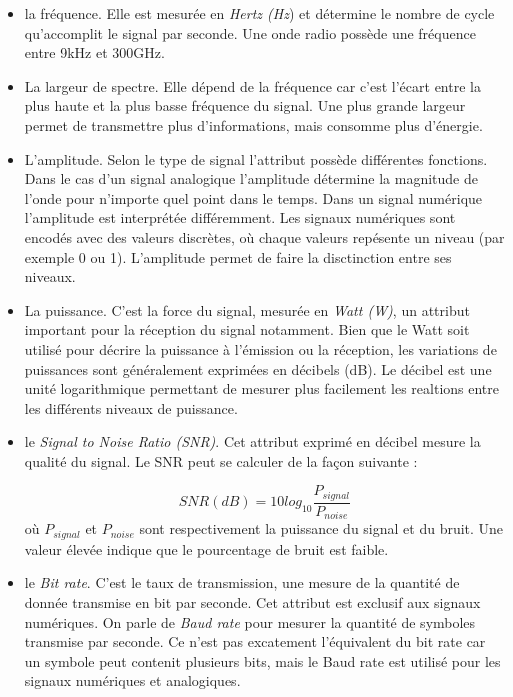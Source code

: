 \vspace{0.1cm}

\begin{itemize}



\item la fréquence. Elle est mesurée en \textit{Hertz (Hz}) et détermine le nombre de cycle qu'accomplit le signal par seconde. Une onde radio possède une fréquence entre 9kHz et 300GHz.

\item La largeur de spectre. Elle dépend de la fréquence car c'est l'écart entre la plus haute et la plus basse fréquence du signal. Une plus grande largeur permet de transmettre plus d'informations, mais consomme plus d'énergie.

\item L'amplitude. Selon le type de signal l'attribut possède différentes fonctions. Dans le cas d'un signal analogique l'amplitude détermine la magnitude de l'onde pour n'importe quel point dans le temps. Dans un signal numérique l'amplitude est interprétée différemment. Les signaux numériques sont encodés avec des valeurs discrètes, où chaque valeurs repésente un niveau (par exemple 0 ou 1). L'amplitude permet de faire la disctinction entre ses niveaux.

\item La puissance. C'est la force du signal, mesurée en \textit{Watt (W)}, un attribut important pour la réception du signal notamment. Bien que le Watt soit utilisé pour décrire la puissance à l'émission ou la réception, les variations de puissances sont généralement exprimées en décibels (dB). Le décibel est une unité logarithmique permettant de mesurer plus facilement les realtions entre les différents niveaux de puissance.

\item le \textit{Signal to Noise Ratio (SNR)}. Cet attribut exprimé en décibel mesure la qualité du signal. Le SNR peut se calculer de la façon suivante : 

\begin{equation}\label{eq0}
SNR(dB) = 10log_{10} \frac{P_{signal}}{P_{noise}}
\end{equation}
où $P_{signal}$ et $P_{noise}$ sont respectivement la puissance du signal et du bruit. Une valeur élevée indique que le pourcentage de bruit est faible. 


\item le \textit{Bit rate}. C'est le taux de transmission, une mesure de la quantité de donnée transmise en bit par seconde. Cet attribut est exclusif aux signaux numériques. On parle de \textit{Baud rate} pour mesurer la quantité de symboles transmise par seconde. Ce n'est pas excatement l'équivalent du bit rate car un symbole peut contenit plusieurs bits, mais le Baud rate est utilisé pour les signaux numériques et analogiques.

\end{itemize}


